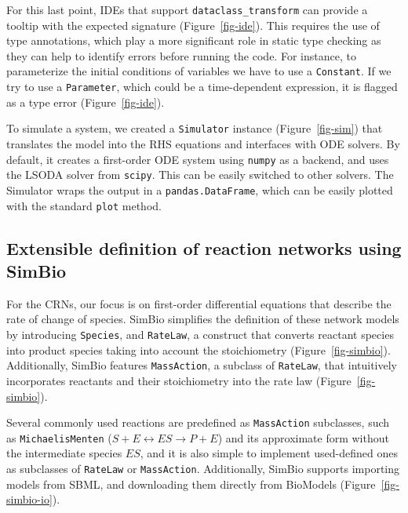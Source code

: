 \documentclass{article}
\begin{document}


For this last point,
\acp{IDE} that support \texttt{dataclass\_transform} \cite{debontePEP681Data2021}
can provide a tooltip with the expected signature (Figure~\ref{fig-ide}).
This requires the use of type annotations,
which play a more significant role in static type checking
as they can help to identify errors before running the code.
For instance, to parameterize the initial conditions of variables
we have to use a \texttt{Constant}.
If we try to use a \texttt{Parameter},
which could be a time-dependent expression,
it is flagged as a type error (Figure~\ref{fig-ide}).

To simulate a system,
we created a \texttt{Simulator} instance (Figure~\ref{fig-sim})
that translates the model into the \ac{RHS} equations
and interfaces with \ac{ODE} solvers.
By default,
it creates a first-order \ac{ODE} system using \texttt{numpy} as a backend,
and uses the LSODA solver from \texttt{scipy}.
This can be easily switched to other solvers.
The Simulator wraps the output in a \texttt{pandas.DataFrame},
which can be easily plotted with the standard \texttt{plot} method.

\hypertarget{extensible-definition-of-reaction-networks-using-simbio}{%
\subsection{Extensible definition of reaction networks using
SimBio}\label{extensible-definition-of-reaction-networks-using-simbio}}

For the \acp{CRN},
our focus is on first-order differential equations that describe the rate of change of species.
SimBio simplifies the definition of these network models by introducing \texttt{Species},
and \texttt{RateLaw}, a construct that converts reactant species into product species taking into account the stoichiometry (Figure~\ref{fig-simbio}).
Additionally, SimBio features \texttt{MassAction},
a subclass of \texttt{RateLaw},
that intuitively incorporates reactants and their stoichiometry into the rate law (Figure~\ref{fig-simbio}).

Several commonly used reactions are predefined as \texttt{MassAction} subclasses,
such as \texttt{MichaelisMenten} (\(S + E \leftrightarrow ES \rightarrow P + E\))
and its approximate form without the intermediate species \(ES\),
and it is also simple to implement used-defined ones
as subclasses of \texttt{RateLaw} or \texttt{MassAction}.
Additionally, SimBio supports importing models from \ac{SBML},
and downloading them directly from BioModels \cite{malik-sheriffBioModels15Years2020} (Figure~\ref{fig-simbio-io}).
\end{document}
